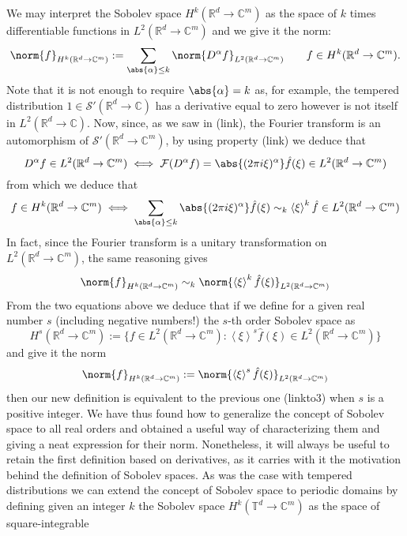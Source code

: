 \documentclass[
]{article}
\begin{document}
We may interpret the Sobolev space \(H^k({\mathbb R}^d\to\mathbb{C}^m)\)
as the space of \(k\) times differentiable functions in
\(L^2({\mathbb R}^d\to\mathbb{C}^m)\) and we give it the norm:
\[\norm{f}_{H^k({\mathbb R}^d\to\mathbb{C}^m)}:=\sum_{\abs{\alpha}\leq k}\norm{D^\alpha f}_{L^2({\mathbb R}^d\to\mathbb{C}^m)}\qquad f\in H^k({\mathbb R}^d\to\mathbb{C}^m).\]
Note that it is not enough to require \(\abs{\alpha}=k\) as, for
example, the tempered distribution
\(1 \in {\mathcal S}'({\mathbb R}^d\to\mathbb{C})\) has a derivative
equal to zero however is not itself in
\(L^2({\mathbb R}^d\to\mathbb{C})\). Now, since, as we saw in (link),
the Fourier transform is an automorphism of
\({\mathcal S}'({\mathbb R}^d\to\mathbb{C}^m)\), by using property
(link) we deduce that
\[D^\alpha f\in L^2({\mathbb R}^d\to\mathbb{C}^m)\iff \mathcal{F}(D^\alpha f)=\abs{(2\pi i\xi )^{\alpha}} \hat{f}(\xi)\in L^2({\mathbb R}^d\to\mathbb{C}^m)\]
from which we deduce that \[\label{sobolevcondition}
	f\in H^k({\mathbb R}^d\to\mathbb{C}^m)\iff \sum_{\abs{\alpha}\leq k} \abs{(2\pi i\xi )^{\alpha}}\hat{f}(\xi)\sim_k \left\langle\xi\right\rangle^k\hat{f}\in L^2({\mathbb R}^d\to\mathbb{C}^m)\]
In fact, since the Fourier transform is a unitary transformation on
\(L^2({\mathbb R}^d\to\mathbb{C}^m)\), the same reasoning gives
\[\label{sobolevnorm}
	\norm{f}_{H^k({\mathbb R}^d\to\mathbb{C}^m)}\sim_k \norm{\left\langle\xi\right\rangle^k\hat{f}(\xi)}_{L^2({\mathbb R}^d\to\mathbb{C}^m)}\]
From the two equations above we deduce that if we define for a given
real number \(s\) (including negative numbers!) the \(s\)-th order
Sobolev space as
\[H^s({\mathbb R}^d\to\mathbb{C}^m):=\lbrace f\in L^2({\mathbb R}^d\to\mathbb{C}^m): \left\langle\xi\right\rangle^s\hat{f}(\xi)\in L^2({\mathbb R}^d\to\mathbb{C}^m)\rbrace\]
and give it the norm
\[\norm{f}_{H^k({\mathbb R}^d\to\mathbb{C}^m)}:= \norm{\left\langle\xi\right\rangle^s\hat{f}(\xi)}_{L^2({\mathbb R}^d\to\mathbb{C}^m)}\]
then our new definition is equivalent to the previous one (linkto3) when
\(s\) is a positive integer. We have thus found how to generalize the
concept of Sobolev space to all real orders and obtained a useful way of
characterizing them and giving a neat expression for their norm.
Nonetheless, it will always be useful to retain the first definition
based on derivatives, as it carries with it the motivation behind the
definition of Sobolev spaces. As was the case with tempered
distributions we can extend the concept of Sobolev space to periodic
domains by defining given an integer \(k\) the Sobolev space
\(H^k({\mathbb T}^d\to\mathbb{C}^m)\) as the space of square-integrable
\end{document}

